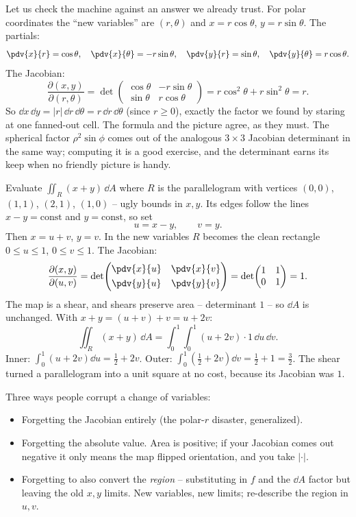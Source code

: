 Let us check the machine against an answer we already trust. For polar
coordinates the ``new variables'' are $(r,\theta)$ and
$x=r\cos\theta$, $y=r\sin\theta$. The partials:
\[
  \pdv{x}{r}=\cos\theta,\quad \pdv{x}{\theta}=-r\sin\theta,\quad
  \pdv{y}{r}=\sin\theta,\quad \pdv{y}{\theta}=r\cos\theta .
\]
The Jacobian:
\[
  \frac{\partial(x,y)}{\partial(r,\theta)}
  =\det\!\begin{pmatrix}\cos\theta & -r\sin\theta\\ \sin\theta & r\cos\theta\end{pmatrix}
  =r\cos^2\theta+r\sin^2\theta=r .
\]
So $\dd x\,\dd y=|r|\,\dd r\,\dd\theta=r\,\dd r\,\dd\theta$ (since $r\ge0$),
exactly the factor we found by staring at one fanned-out cell. The formula and the
picture agree, as they must. The spherical factor $\rho^2\sin\phi$ comes out of
the analogous $3\times 3$ Jacobian determinant in the same way; computing it is a
good exercise, and the determinant earns its keep when no friendly picture is
handy.

\begin{example}
\label{ch34:ex-cov}
Evaluate $\iint_R (x+y)\,\dd A$ where $R$ is the parallelogram with vertices
$(0,0)$, $(1,1)$, $(2,1)$, $(1,0)$ -- ugly bounds in $x,y$. Its edges follow the
lines $x-y=\text{const}$ and $y=\text{const}$, so set
\[
  u=x-y,\qquad v=y .
\]
Then $x=u+v$, $y=v$. In the new variables $R$ becomes the clean rectangle
$0\le u\le 1$, $0\le v\le 1$. The Jacobian:
\[
  \frac{\partial(x,y)}{\partial(u,v)}
  =\det\!\begin{pmatrix}\pdv{x}{u}&\pdv{x}{v}\\[3pt]\pdv{y}{u}&\pdv{y}{v}\end{pmatrix}
  =\det\!\begin{pmatrix}1&1\\0&1\end{pmatrix}=1 .
\]
The map is a shear, and shears preserve area -- determinant $1$ -- so $\dd A$ is
unchanged. With $x+y=(u+v)+v=u+2v$:
\[
  \iint_R(x+y)\,\dd A=\int_0^1\!\int_0^1 (u+2v)\cdot 1\,\dd u\,\dd v .
\]
Inner: $\int_0^1(u+2v)\dd u=\tfrac12+2v$. Outer:
$\int_0^1(\tfrac12+2v)\dd v=\tfrac12+1=\tfrac32$. The shear turned a
parallelogram into a unit square at no cost, because its Jacobian was $1$.
\end{example}

\begin{trapbox}
Three ways people corrupt a change of variables:
\begin{itemize}
\item Forgetting the Jacobian entirely (the polar-$r$ disaster, generalized).
\item Forgetting the absolute value. Area is positive; if your Jacobian comes out
negative it only means the map flipped orientation, and you take $|\cdot|$.
\item Forgetting to also convert the \emph{region} -- substituting in $f$ and the
$\dd A$ factor but leaving the old $x,y$ limits. New variables, new limits;
re-describe the region in $u,v$.
\end{itemize}
\end{trapbox}

